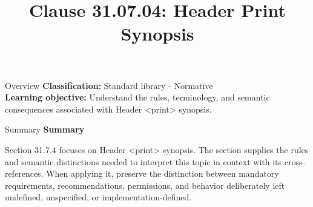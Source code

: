 \documentclass[10pt,letterpaper]{article}
\title{Clause 31.07.04: Header Print Synopsis}
\author{}
\date{}
\begin{document}
\maketitle
\begin{CornellOverviewBox}{Overview}
\textbf{Classification:} Standard library - Normative\\[2pt]
\textbf{Learning objective:} Understand the rules, terminology, and semantic consequences associated with Header <print> synopsis.
\end{CornellOverviewBox}\begin{CornellSummaryBox}{Summary}
{\sffamily\bfseries\color{Accent} Summary}\par\vspace{3pt}Section 31.7.4 focuses on Header <print> synopsis. The section supplies the rules and semantic distinctions needed to interpret this topic in context with its cross-references. When applying it, preserve the distinction between mandatory requirements, recommendations, permissions, and behavior deliberately left undefined, unspecified, or implementation-defined.
\end{CornellSummaryBox}
\end{document}
